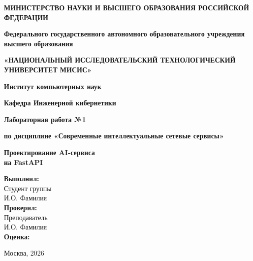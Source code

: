 \documentclass[12pt,a4paper]{article}
\begin{document}
\begin{titlepage}
    \begin{center}
        \textbf{МИНИСТЕРСТВО НАУКИ И ВЫСШЕГО ОБРАЗОВАНИЯ РОССИЙСКОЙ ФЕДЕРАЦИИ}
        \vspace{0.5cm}
        
        \textbf{Федерального государственного автономного образовательного учреждения \\ высшего образования}
        \vspace{0.3cm}
        
        \textbf{«НАЦИОНАЛЬНЫЙ ИССЛЕДОВАТЕЛЬСКИЙ ТЕХНОЛОГИЧЕСКИЙ УНИВЕРСИТЕТ МИСИС»}
        \vspace{2cm}

        
        \textbf{Институт компьютерных наук}
        \vspace{0.3cm}

        \textbf{Кафедра Инженерной кибернетики}
        \vspace{1cm}
        
        \textbf{Лабораторная работа №1}
        \vspace{0.3cm}
        
        \textbf{по дисциплине «Современные интеллектуальные сетевые сервисы»}
        \vspace{1.5cm}
        
        \huge{\textbf{Проектирование AI-сервиса \\ на FastAPI}}
        \vspace{2cm}
    \end{center}
    
    \begin{flushright}
        \textbf{Выполнил:} \\
        Студент группы \\
        И.О. Фамилия \\
        \vspace{0.5cm}
        \textbf{Проверил:} \\
        Преподаватель \\
        И.О. Фамилия \\
        \vspace{2cm}
        \textbf{Оценка:} \hrulefill
    \end{flushright}
    
    \begin{center}
        \vfill
        Москва, 2026
    \end{center}
\end{titlepage}
\end{document}
